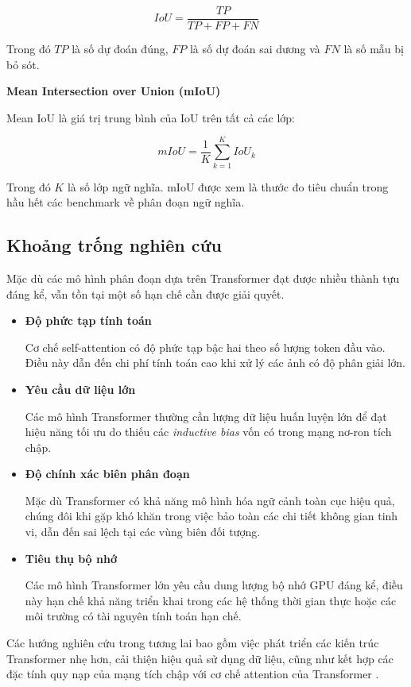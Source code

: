 \begin{equation}
IoU = \frac{TP}{TP + FP + FN}
\end{equation}

Trong đó $TP$ là số dự đoán đúng, $FP$ là số dự đoán sai dương và $FN$ là số mẫu bị bỏ sót.

\textbf{Mean Intersection over Union (mIoU)}

Mean IoU là giá trị trung bình của IoU trên tất cả các lớp:

\begin{equation}
mIoU = \frac{1}{K}\sum_{k=1}^{K} IoU_k
\end{equation}

Trong đó $K$ là số lớp ngữ nghĩa. 
mIoU được xem là thước đo tiêu chuẩn trong hầu hết các benchmark về phân đoạn ngữ nghĩa.

\subsection{Khoảng trống nghiên cứu}

Mặc dù các mô hình phân đoạn dựa trên Transformer đạt được nhiều thành tựu đáng kể, vẫn tồn tại một số hạn chế cần được giải quyết.

\begin{itemize}

\item \textbf{Độ phức tạp tính toán}

Cơ chế self-attention có độ phức tạp bậc hai theo số lượng token đầu vào. 
Điều này dẫn đến chi phí tính toán cao khi xử lý các ảnh có độ phân giải lớn.

\item \textbf{Yêu cầu dữ liệu lớn}

Các mô hình Transformer thường cần lượng dữ liệu huấn luyện lớn để đạt hiệu năng tối ưu do thiếu các \textit{inductive bias} vốn có trong mạng nơ-ron tích chập.

\item \textbf{Độ chính xác biên phân đoạn}

Mặc dù Transformer có khả năng mô hình hóa ngữ cảnh toàn cục hiệu quả, chúng đôi khi gặp khó khăn trong việc bảo toàn các chi tiết không gian tinh vi, dẫn đến sai lệch tại các vùng biên đối tượng.

\item \textbf{Tiêu thụ bộ nhớ}

Các mô hình Transformer lớn yêu cầu dung lượng bộ nhớ GPU đáng kể, điều này hạn chế khả năng triển khai trong các hệ thống thời gian thực hoặc các môi trường có tài nguyên tính toán hạn chế.

\end{itemize}

Các hướng nghiên cứu trong tương lai bao gồm việc phát triển các kiến trúc Transformer nhẹ hơn, cải thiện hiệu quả sử dụng dữ liệu, cũng như kết hợp các đặc tính quy nạp của mạng tích chập với cơ chế attention của Transformer \cite{xie2021segformer,liu2021swin}.
